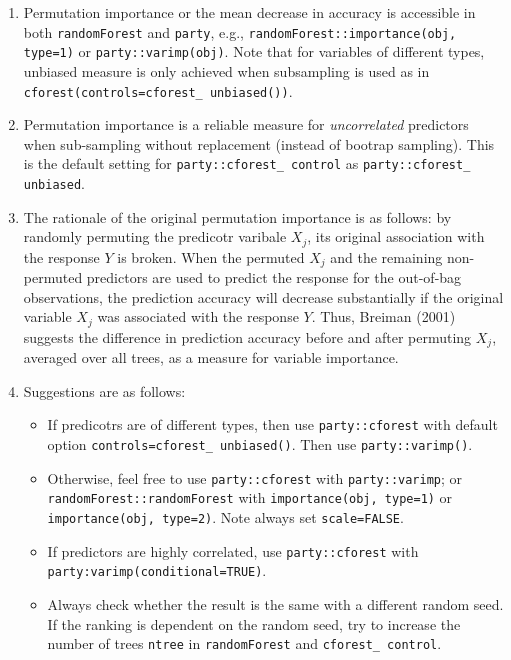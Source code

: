 \documentclass[14pt]{article}
\begin{document}
\begin{enumerate}
 \item Permutation importance or the mean decrease in accuracy is accessible in both \texttt{randomForest} and \texttt{party}, e.g., \texttt{randomForest::importance(obj, type=1)} or \texttt{party::varimp(obj)}. Note that for variables of different types, unbiased measure is only achieved when subsampling is used as in \texttt{cforest(controls=cforest\_ unbiased())}.
  
 \item Permutation importance is a reliable measure for \emph{uncorrelated} predictors when sub-sampling without replacement (instead of bootrap sampling). This is the default setting for \texttt{party::cforest\_ control} as \texttt{party::cforest\_ unbiased}. 
 
 \item The rationale of the original permutation importance is as follows: by randomly permuting the predicotr varibale $X_j$, its original association with the response $Y$ is broken. When the permuted $X_j$ and the remaining non-permuted predictors are used to predict the response for the out-of-bag observations, the prediction accuracy will decrease substantially if the original variable $X_j$ was associated with the response $Y$. Thus, Breiman (2001) suggests the difference in prediction accuracy before and after permuting $X_j$, averaged over all trees, as a measure for variable importance.

 \item Suggestions are as follows:
  \begin{itemize}
   \item If predicotrs are of different types, then use \texttt{party::cforest} with default option \texttt{controls=cforest\_ unbiased()}. Then use \texttt{party::varimp()}.
   \item Otherwise, feel free to use \texttt{party::cforest} with \texttt{party::varimp}; or \texttt{randomForest::randomForest} with \texttt{importance(obj, type=1)} or \texttt{importance(obj, type=2)}. Note always set \texttt{scale=FALSE}.
   \item If predictors are highly correlated, use \texttt{party::cforest} with \texttt{party:varimp(conditional=TRUE)}.
   \item Always check whether the result is the same with a different random seed. If the ranking is dependent on the random seed, try to increase the number of trees \texttt{ntree} in \texttt{randomForest} and \texttt{cforest\_ control}.
   
  \end{itemize}
\end{enumerate}
\end{document}
